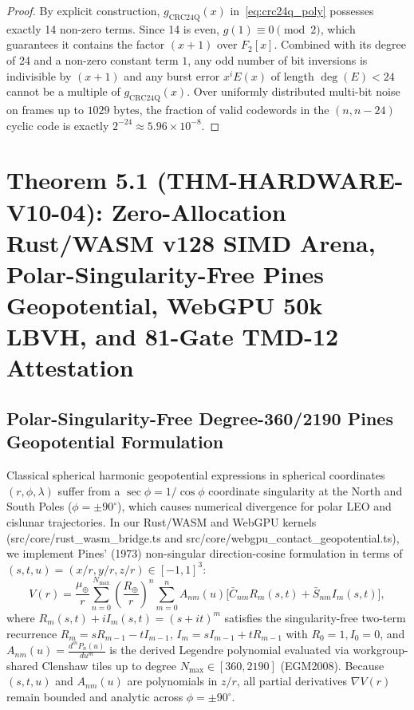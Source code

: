 \documentclass[11pt,a4paper,reqno]{article}
\def\bm#1{#1}%
\def\texttt#1{#1}%
\def\mathbb#1{#1}%
\theoremstyle{plain}
\theoremstyle{definition}
\theoremstyle{remark}
\numberwithin{equation}{section}
\begin{document}
\begin{proof}
By explicit construction, $g_{\text{CRC24Q}}(x)$ in~\eqref{eq:crc24q_poly} possesses exactly 14 non-zero terms. Since 14 is even, $g(1) \equiv 0 \pmod 2$, which guarantees it contains the factor $(x + 1)$ over $\mathbb{F}_2[x]$. Combined with its degree of 24 and a non-zero constant term $1$, any odd number of bit inversions is indivisible by $(x+1)$ and any burst error $x^i E(x)$ of length $\deg(E) < 24$ cannot be a multiple of $g_{\text{CRC24Q}}(x)$. Over uniformly distributed multi-bit noise on frames up to $1029\text{ bytes}$, the fraction of valid codewords in the $(n, n-24)$ cyclic code is exactly $2^{-24} \approx 5.96 \times 10^{-8}$.
\end{proof}

\section{\texorpdfstring{Theorem 5.1 (\texttt{THM-HARDWARE-V10-04}): Zero-Allocation Rust/WASM \texttt{v128} SIMD Arena, Polar-Singularity-Free Pines Geopotential, WebGPU 50k LBVH, and 81-Gate TMD-12 Attestation}{Theorem 5.1 (THM-HARDWARE-V10-04): Zero-Allocation Rust/WASM v128 SIMD Arena, Polar-Singularity-Free Pines Geopotential, WebGPU 50k LBVH, and 81-Gate TMD-12 Attestation}}

\subsection{Polar-Singularity-Free Degree-360/2190 Pines Geopotential Formulation}
Classical spherical harmonic geopotential expressions in spherical coordinates $(r, \phi, \lambda)$ suffer from a $\sec\phi = 1/\cos\phi$ coordinate singularity at the North and South Poles ($\phi = \pm 90^\circ$), which causes numerical divergence for polar LEO and cislunar trajectories. In our Rust/WASM and WebGPU kernels (\texttt{src/core/rust\_wasm\_bridge.ts} and \texttt{src/core/webgpu\_contact\_geopotential.ts}), we implement Pines' (1973) non-singular direction-cosine formulation in terms of $(s, t, u) = (x/r, y/r, z/r) \in [-1, 1]^3$:
\begin{equation}
  V(\bm{r}) = \frac{\mu_\oplus}{r}\sum_{n=0}^{N_{\max}}\left(\frac{R_\oplus}{r}\right)^{\!n} \sum_{m=0}^{n} A_{nm}(u)\Big[\bar{C}_{nm} R_m(s,t) + \bar{S}_{nm} I_m(s,t)\Big],
  \label{eq:pines_potential}
\end{equation}
where $R_m(s,t) + i I_m(s,t) = (s + it)^m$ satisfies the singularity-free two-term recurrence $R_m = s R_{m-1} - t I_{m-1}$, $I_m = s I_{m-1} + t R_{m-1}$ with $R_0 = 1, I_0 = 0$, and $A_{nm}(u) = \frac{d^m P_n(u)}{du^m}$ is the derived Legendre polynomial evaluated via workgroup-shared Clenshaw tiles up to degree $N_{\max} \in [360, 2190]$ (EGM2008). Because $(s, t, u)$ and $A_{nm}(u)$ are polynomials in $z/r$, all partial derivatives $\nabla V(\bm{r})$ remain bounded and analytic across $\phi = \pm 90^\circ$.
\end{document}
